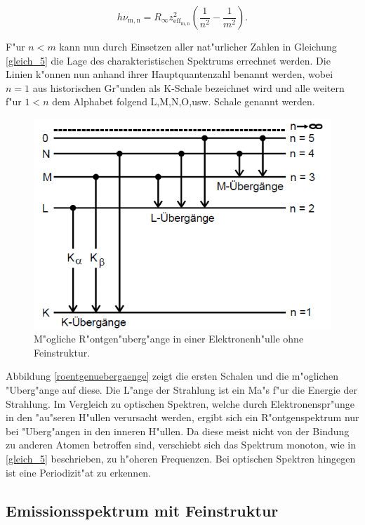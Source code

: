 		\begin{equation}
			h \nu_\mathrm{m,n} = R_\infty z_{\mathrm{eff}_\mathrm{m,n}}^2 \left( \frac{1}{n^2} - \frac{1}{m^2} \right). \label{gleich_5}
		\end{equation}

		F"ur $n < m$ kann nun durch Einsetzen aller nat"urlicher Zahlen in Gleichung \eqref{gleich_5} die Lage des charakteristischen Spektrums errechnet werden.
		Die Linien k"onnen nun anhand ihrer Hauptquantenzahl benannt werden, wobei $n = 1$ aus historischen Gr"unden als K-Schale bezeichnet wird und alle weitern f"ur $1 < n$ dem Alphabet folgend L,M,N,O,usw. Schale genannt werden. 

		\begin{figure}[htbp]
			\centering
			\includegraphics[width = 12cm]{img/Roentgenuebergaenge.png}
			\caption{M"ogliche R"ontgen"uberg"ange in einer Elektronenh"ulle ohne Feinstruktur. \cite{anleitung}}
			\label{roentgenuebergaenge}
		\end{figure}

		Abbildung \eqref{roentgenuebergaenge} zeigt die ersten Schalen und die m"oglichen "Uberg"ange auf diese. Die L"ange der Strahlung ist ein Ma"s f"ur die Energie der Strahlung.
		Im Vergleich zu optischen Spektren, welche durch Elektronenspr"unge in den "au"seren H"ullen verursacht werden, ergibt sich ein R"ontgenspektrum nur bei "Uberg"angen in den inneren H"ullen.
		Da diese meist nicht von der Bindung zu anderen Atomen betroffen sind, verschiebt sich das Spektrum monoton, wie in \eqref{gleich_5} beschrieben, zu h"oheren Frequenzen.
		Bei optischen Spektren hingegen ist eine Periodizit"at zu erkennen.

	\subsection{Emissionsspektrum mit Feinstruktur}
	\label{sub:emissionsspektrum_mit_feinstruktur}
	
